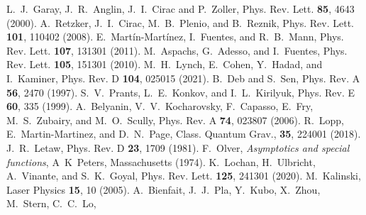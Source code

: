 \documentclass[aps,prl,nofootinbib,preprintnumbers,floatfix,twocolumn,superscriptaddress]{revtex4}
\begin{document}
\begin{thebibliography}{50}
L.~J.~Garay, J.~R.~Anglin, J.~I.~Cirac and P.~Zoller, Phys. Rev. Lett. 
{\bf 85}, 4643 (2000).
A.~Retzker, J.~I.~Cirac, M.~B.~Plenio, and B.~Reznik,
Phys. Rev. Lett. {\bf 101}, 110402 (2008).
E.~Martín-Martínez, I.~Fuentes, and R.~B.~Mann, Phys. Rev. Lett. {\bf 107},
131301 (2011).
M.~Aspachs, G.~Adesso, and I.~Fuentes, Phys. Rev. Lett. {\bf 105}, 151301 (2010).
M.~H.~Lynch, E.~Cohen, Y.~Hadad, and I.~Kaminer, 
Phys. Rev. D {\bf 104}, 025015 (2021). 
B.~Deb and S.~Sen, Phys. Rev. A {\bf 56}, 2470 (1997). 
S.~V.~Prants, L.~E.~Konkov, and I.~L.~Kirilyuk, Phys. Rev. E {\bf 60}, 335 (1999).
A.~Belyanin, V.~V.~Kocharovsky, F.~Capasso, E.~Fry,
M.~S.~Zubairy, and M.~O.~Scully, Phys. Rev. A {\bf 74}, 023807 (2006).
R.~Lopp, E.~Martin-Martinez, and D.~N.~Page, Class. Quantum Grav., {\bf 35}, 
224001 (2018). 
J.~R.~Letaw, Phys. Rev. D {\bf 23}, 1709 (1981).
F.~Olver, {\it Asymptotics and special functions},
A~K~Peters, Massachusetts (1974).
K.~Lochan, H.~Ulbricht, A.~Vinante, and S.~K.~Goyal, Phys. Rev. Lett. {\bf 125},
241301 (2020).
M.~Kalinski, Laser Physics {\bf 15}, 10 (2005). 
A.~Bienfait, J.~J.~Pla, Y.~Kubo, X.~Zhou, M.~Stern, C.~C.~Lo, 

\end{thebibliography}
\end{document}
